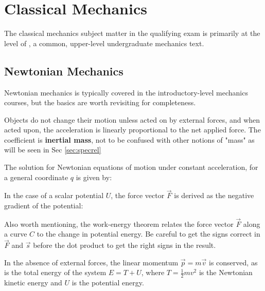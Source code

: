 \newpage
\chapter{Classical Mechanics}
\label{sec:classmech}
The classical mechanics subject matter in the qualifying exam is primarily at the level of \cite{thorntonClassicalDynamicsParticles2004}, a common, upper-level undergraduate mechanics text.


\section{Newtonian Mechanics}
\label{sec:cm-newtonian}
Newtonian mechanics is typically covered in the introductory-level mechanics courses, but the basics are worth revisiting for completeness. 

Objects do not change their motion unless acted on by external forces, and when acted upon, the acceleration is linearly proportional to the net applied force. The coefficient is \textbf{inertial mass}, not to be confused with other notions of "mass" as will be seen in Sec \ref{sec:specrel}


The solution for Newtonian equations of motion under constant acceleration, for a general coordinate $q$ is given by: 


In the case of a scalar potential $U$, the force vector $\vec{F}$ is derived as the negative gradient of the potential:

Also worth mentioning, the work-energy theorem relates the force vector $\vec{F}$ along a curve $C$ to the change in potential energy. Be careful to get the signs correct in $\vec{F}$ and $\vec{s}$ before the dot product to get the right signs in the result.
 

In the absence of external forces, the linear momentum $\vec{p} = m\vec{v}$ is conserved, as is the total energy of the system $E = T + U$, where $T = \frac{1}{2}mv^2$ is the Newtonian kinetic energy and $U$ is the potential energy. 


